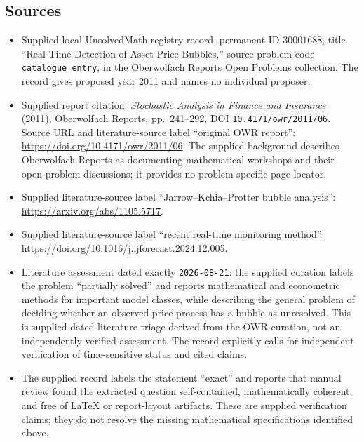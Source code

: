 \documentclass[11pt]{article}
\begin{document}
\subsection{Sources}
\begin{itemize}
\item Supplied local UnsolvedMath registry record, permanent ID \(30001688\), title ``Real-Time Detection of Asset-Price Bubbles,'' source problem code \texttt{catalogue entry}, in the Oberwolfach Reports Open Problems collection. The record gives proposed year 2011 and names no individual proposer.
\item Supplied report citation: \emph{Stochastic Analysis in Finance and Insurance} (2011), Oberwolfach Reports, pp.\ 241--292, DOI \texttt{10.4171/owr/2011/06}. Source URL and literature-source label ``original OWR report'': \url{https://doi.org/10.4171/owr/2011/06}. The supplied background describes Oberwolfach Reports as documenting mathematical workshops and their open-problem discussions; it provides no problem-specific page locator.
\item Supplied literature-source label ``Jarrow--Kchia--Protter bubble analysis'': \url{https://arxiv.org/abs/1105.5717}.
\item Supplied literature-source label ``recent real-time monitoring method'': \url{https://doi.org/10.1016/j.ijforecast.2024.12.005}.
\item Literature assessment dated exactly \texttt{2026-08-21}: the supplied curation labels the problem ``partially solved'' and reports mathematical and econometric methods for important model classes, while describing the general problem of deciding whether an observed price process has a bubble as unresolved. This is supplied dated literature triage derived from the OWR curation, not an independently verified assessment. The record explicitly calls for independent verification of time-sensitive status and cited claims.
\item The supplied record labels the statement ``exact'' and reports that manual review found the extracted question self-contained, mathematically coherent, and free of LaTeX or report-layout artifacts. These are supplied verification claims; they do not resolve the missing mathematical specifications identified above.
\end{itemize}
\end{document}

